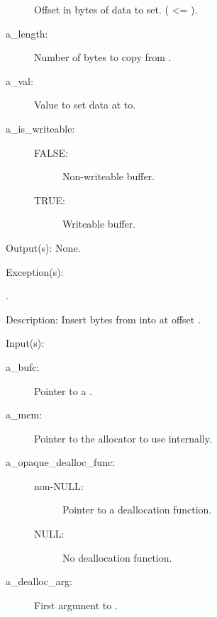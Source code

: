 \begin{capi}
\begin{capilist}
\begin{description}
			Offset in bytes of data to set. ( <=
			).
		\item[a\_length: ]
			Number of bytes to copy from .
		\item[a\_val: ]
			Value to set data at  to.
		\item[a\_is\_writeable: ]
			\begin{description}\item[]
			\item[FALSE: ]
				Non-writeable buffer.
			\item[TRUE: ]
				Writeable buffer.
			\end{description}
		\end{description}
	\item[Output(s): ] None.
	\item[Exception(s): ]
		\begin{description}\item[]
		\item[.]
		\end{description}
	\item[Description: ]
		Insert  bytes from  into
		 at offset .
	\end{capilist}
\label{bufc_new}
	\begin{capilist}
	\item[Input(s): ]
		\begin{description}\item[]
		\item[a\_bufc: ]
			Pointer to a .
		\item[a\_mem: ]
			Pointer to the allocator to use internally.
		\item[a\_opaque\_dealloc\_func: ]
			\begin{description}\item[]
			\item[non-NULL: ] Pointer to a deallocation function.
			\item[NULL: ] No deallocation function.
			\end{description}
		\item[a\_dealloc\_arg: ]
			First argument to .
		\end{description}

\end{capilist}
\end{capi}
